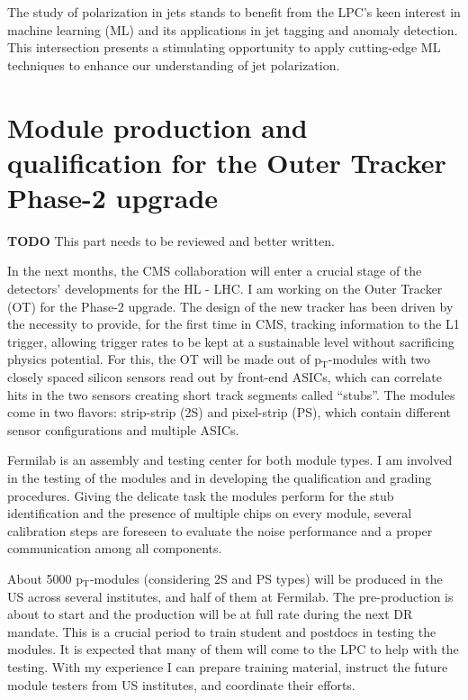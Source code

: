 {\begin{flushleft}
The study of polarization in jets stands to benefit from the LPC's keen interest in machine learning (ML) and its applications in jet tagging and anomaly detection. This intersection presents a stimulating opportunity to apply cutting-edge ML techniques to enhance our understanding of jet polarization.

\vspace{\baselineskip}
\section{Module production and qualification for the Outer Tracker Phase-2 upgrade}
{\bf TODO} This part needs to be reviewed and better written.

In the next months, the CMS collaboration will enter a crucial stage of the detectors' developments for the HL - LHC. I am working on the Outer Tracker (OT) for the Phase-2 upgrade.
The design of the new tracker has been driven by the necessity to provide, for the first time in CMS, tracking information to the L1 trigger, allowing trigger rates to be kept at a sustainable level without sacrificing physics potential. For this, the OT will be made out of p$_{\mathrm{T}}$-modules with two closely spaced silicon sensors read out by front-end ASICs, which can correlate hits in the two sensors creating short track segments called ``stubs''. The modules come in two flavors: strip-strip (2S) and pixel-strip (PS), which contain different sensor configurations and multiple ASICs. 

Fermilab is an assembly and testing center for both module types. I am involved in the testing of the modules and in developing the qualification and grading procedures. Giving the delicate task the modules perform for the stub identification and the presence of multiple chips on every module, several calibration steps are foreseen to evaluate the noise performance and a proper communication among all components. 

About 5000 p$_{\mathrm{T}}$-modules (considering 2S and PS types) will be produced in the US across several institutes, and half of them at Fermilab. The pre-production is about to start and the production will be at full rate during the next DR mandate. This is a crucial period to train student and postdocs in testing the modules. It is expected that many of them will come to the LPC to help with the testing. With my experience I can prepare training material, instruct the future module testers from US institutes, and coordinate their efforts.


\end{flushleft}}
